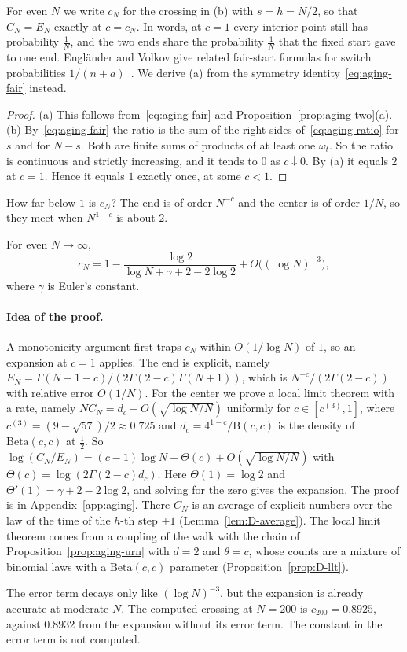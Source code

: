 For even $N$ we write $c_N$ for the crossing in (b) with $s=h=N/2$, so that
$C_N=E_N$ exactly at $c=c_N$. In words, at $c=1$ every interior point still has
probability $\frac1N$, and the two ends share the probability $\frac1N$ that
the fixed start gave to one end.
Engl\"ander and Volkov give related fair-start formulas for switch
probabilities $1/(n+a)$~. We derive (a) from the
symmetry identity~\eqref{eq:aging-fair} instead.

\begin{proof}
(a) This follows from~\eqref{eq:aging-fair} and
Proposition~\ref{prop:aging-two}(a). (b) By~\eqref{eq:aging-fair} the ratio
is the sum of the right sides of~\eqref{eq:aging-ratio} for $s$ and for
$N-s$. Both are finite sums of products of at least one $\omega_t$. So the
ratio is continuous and strictly increasing, and it tends to $0$ as
$c\downarrow0$. By (a) it equals $2$ at $c=1$. Hence it equals $1$ exactly
once, at some $c<1$.
\end{proof}

How far below $1$ is $c_N$? The end is of order $N^{-c}$ and the center is of
order $1/N$, so they meet when $N^{1-c}$ is about $2$.

\begin{proposition}\label{prop:aging-expansion}
For even $N\to\infty$,
\[
 c_N=1-\frac{\log2}{\log N+\gamma+2-2\log2}+O\bigl((\log N)^{-3}\bigr),
\]
where $\gamma$ is Euler's constant.
\end{proposition}

\paragraph{Idea of the proof.}
A monotonicity argument first traps $c_N$ within $O(1/\log N)$ of $1$, so an expansion at $c=1$
applies. The end is explicit, namely
$E_N=\Gamma(N+1-c)/(2\Gamma(2-c)\Gamma(N+1))$, which is
$N^{-c}/(2\Gamma(2-c))$ with relative error $O(1/N)$. For the center we prove
a local limit theorem with a rate, namely $NC_N=d_c+O(\sqrt{\log N/N})$ uniformly
for $c\in[c^{(3)},1]$, where $c^{(3)}=(9-\sqrt{57})/2\approx0.725$ and $d_c=4^{1-c}/\mathrm B(c,c)$ is the density of
$\mathrm{Beta}(c,c)$ at $\frac12$. So
$\log(C_N/E_N)=(c-1)\log N+\Theta(c)+O(\sqrt{\log N/N})$ with
$\Theta(c)=\log(2\Gamma(2-c)d_c)$. Here $\Theta(1)=\log2$ and
$\Theta'(1)=\gamma+2-2\log2$, and solving for the zero gives the expansion.
The proof is in Appendix~\ref{app:aging}. There $C_N$ is an average of
explicit numbers over the law of the time of the $h$-th step $+1$
(Lemma~\ref{lem:D-average}). The local limit theorem comes from a coupling of
the walk with the chain of Proposition~\ref{prop:aging-urn} with $d=2$ and
$\theta=c$, whose counts are a mixture of binomial laws with a
$\mathrm{Beta}(c,c)$ parameter (Proposition~\ref{prop:D-llt}).

The error term decays only like $(\log N)^{-3}$, but the expansion is
already accurate at moderate $N$. The computed crossing at $N=200$ is
$c_{200}=0.8925$, against $0.8932$ from the expansion without its error term. The constant in
the error term is not computed.
